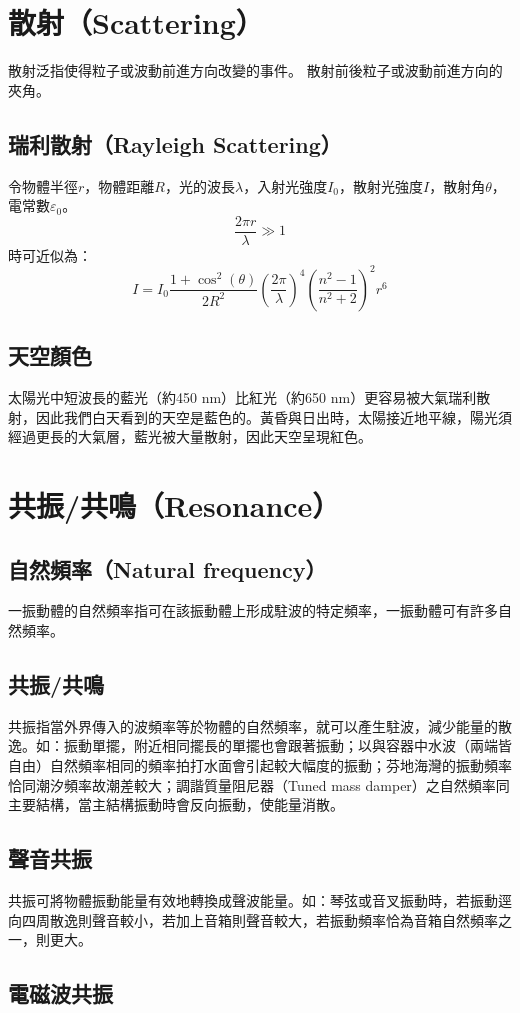 \documentclass[a4paper,12pt]{report}
\begin{document}
\section{散射（Scattering）}
散射泛指使得粒子或波動前進方向改變的事件。
散射前後粒子或波動前進方向的夾角。
\subsection{瑞利散射（Rayleigh Scattering）}
令物體半徑$r$，物體距離$R$，光的波長$\lambda$，入射光強度$I_0$，散射光強度$I$，散射角$\theta$，電常數$\varepsilon_0$。
\[\frac{2\pi r}{\lambda}\gg1\]
時可近似為：
\[I=I_0\frac{1+\cos^2(\theta)}{2R^2}\left(\frac{2\pi}{\lambda}\right)^4\left(\frac{n^2-1}{n^2+2}\right)^2r^6\]
\subsection{天空顏色}
太陽光中短波長的藍光（約450 nm）比紅光（約650 nm）更容易被大氣瑞利散射，因此我們白天看到的天空是藍色的。黃昏與日出時，太陽接近地平線，陽光須經過更長的大氣層，藍光被大量散射，因此天空呈現紅色。


\section{共振/共鳴（Resonance）}
\subsection{自然頻率（Natural frequency）}
一振動體的自然頻率指可在該振動體上形成駐波的特定頻率，一振動體可有許多自然頻率。
\subsection{共振/共鳴}
共振指當外界傳入的波頻率等於物體的自然頻率，就可以產生駐波，減少能量的散逸。如：振動單擺，附近相同擺長的單擺也會跟著振動；以與容器中水波（兩端皆自由）自然頻率相同的頻率拍打水面會引起較大幅度的振動；芬地海灣的振動頻率恰同潮汐頻率故潮差較大；調諧質量阻尼器（Tuned mass damper）之自然頻率同主要結構，當主結構振動時會反向振動，使能量消散。
\subsection{聲音共振}
共振可將物體振動能量有效地轉換成聲波能量。如：琴弦或音叉振動時，若振動逕向四周散逸則聲音較小，若加上音箱則聲音較大，若振動頻率恰為音箱自然頻率之一，則更大。
\subsection{電磁波共振}
\end{document}
